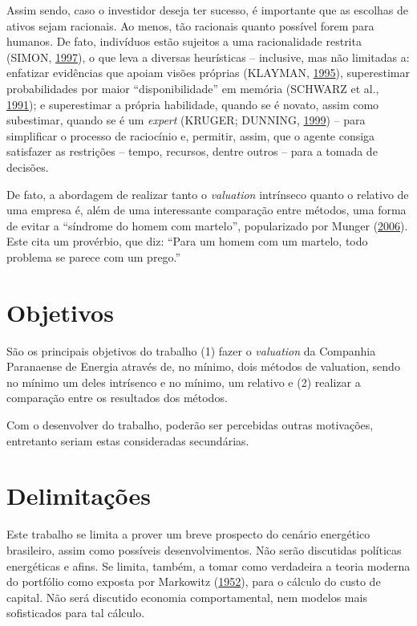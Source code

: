 \documentclass[grad,numbers]{coppe}
\begin{document}
  Assim sendo, caso o investidor deseja ter sucesso, é importante que as escolhas de ativos sejam racionais. Ao menos, tão racionais quanto possível forem para humanos. De fato, indivíduos estão sujeitos a uma racionalidade restrita (SIMON, \protect\hyperlink{ref-simon1997}{1997}), o que leva a diversas heurísticas -- inclusive, mas não limitadas a: enfatizar evidências que apoiam visões próprias (KLAYMAN, \protect\hyperlink{ref-klayman1995}{1995}), superestimar probabilidades por maior ``disponibilidade'' em memória (SCHWARZ et al., \protect\hyperlink{ref-schwarz1991}{1991}); e superestimar a própria habilidade, quando se é novato, assim como subestimar, quando se é um \emph{expert} (KRUGER; DUNNING, \protect\hyperlink{ref-kruger1999}{1999}) -- para simplificar o processo de raciocínio e, permitir, assim, que o agente consiga satisfazer as restrições -- tempo, recursos, dentre outros -- para a tomada de decisões.

  De fato, a abordagem de realizar tanto o \emph{valuation} intrínseco quanto o relativo de uma empresa é, além de uma interessante comparação entre métodos, uma forma de evitar a ``síndrome do homem com martelo'', popularizado por Munger (\protect\hyperlink{ref-munger2006}{2006}). Este cita um provérbio, que diz: ``Para um homem com um martelo, todo problema se parece com um prego.''

  \hypertarget{objetivos}{%
  \section{Objetivos}\label{objetivos}}

  São os principais objetivos do trabalho (1) fazer o \emph{valuation} da Companhia Paranaense de Energia através de, no mínimo, dois métodos de valuation, sendo no mínimo um deles intrísenco e no mínimo, um relativo e (2) realizar a comparação entre os resultados dos métodos.

  Com o desenvolver do trabalho, poderão ser percebidas outras motivações, entretanto seriam estas consideradas secundárias.

  \hypertarget{delimitauxe7uxf5es}{%
  \section{Delimitações}\label{delimitauxe7uxf5es}}

  Este trabalho se limita a prover um breve prospecto do cenário energético brasileiro, assim como possíveis desenvolvimentos. Não serão discutidas políticas energéticas e afins. Se limita, também, a tomar como verdadeira a teoria moderna do portfólio como exposta por Markowitz (\protect\hyperlink{ref-markowitz1952}{1952}), para o cálculo do custo de capital. Não será discutido economia comportamental, nem modelos mais sofisticados para tal cálculo.
\end{document}
